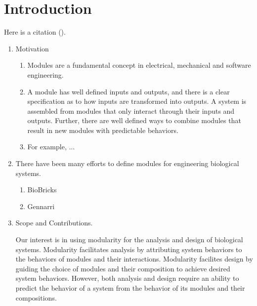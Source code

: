 \documentclass[unnumsec,webpdf,contemporary,large]{oup-authoring-template}%
\theoremstyle{thmstyleone}%
\theoremstyle{thmstyletwo}%
\theoremstyle{thmstylethree}%
\begin{document}

\maketitle


\section{Introduction}
Here is a citation (\cite{al2002handgrip}).
\begin{enumerate}

\item
Motivation
\begin{enumerate}
\item
Modules are a fundamental concept in electrical, mechanical and software engineering.
\item
A module has well defined inputs and outputs, and there is a clear specification as to how inputs are transformed into outputs. A system is assembled from modules that only interact through their inputs and outputs. Further, there are well defined ways to combine modules that result in new modules with predictable behaviors.
\item
For example, ...
\end{enumerate}
\item
There have been many efforts to define modules for engineering biological systems.
\begin{enumerate}
\item BioBricks
\item Gennarri
\end{enumerate}
\item Scope and Contributions.

Our interest is in using modularity for the analysis and design
of biological systems.
Modularity facilitates analysis by
attributing system behaviors to the behaviors of modules
and their interactions.
Modularity facilites design by guiding the choice of
modules and their composition to achieve desired system behaviors.
However,
both analysis and design require an ability to predict
the behavior of a system from the behavior of its modules
and their compositions.


\end{enumerate}
\end{document}
